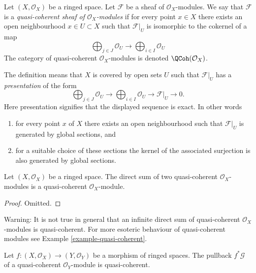 \begin{definition}
\label{definition-quasi-coherent}
Let $(X, \mathcal{O}_X)$ be a ringed space.
Let $\mathcal{F}$ be a sheaf of $\mathcal{O}_X$-modules.
We say that $\mathcal{F}$ is a {\it quasi-coherent
sheaf of $\mathcal{O}_X$-modules} if for every
point $x \in X$ there exists an open neighbourhood
$x\in U \subset X$ such that $\mathcal{F}|_U$
is isomorphic to the cokernel of a map
$$
\bigoplus\nolimits_{j \in J}
\mathcal{O}_U
\longrightarrow
\bigoplus\nolimits_{i \in I}
\mathcal{O}_U
$$
The category of quasi-coherent $\mathcal{O}_X$-modules
is denoted $\QCoh(\mathcal{O}_X)$.
\end{definition}

\noindent
The definition means that $X$ is covered by open sets $U$
such that $\mathcal{F}|_U$ has a {\it presentation}
of the form
$$
\bigoplus\nolimits_{j \in J}
\mathcal{O}_U
\longrightarrow
\bigoplus\nolimits_{i \in I}
\mathcal{O}_U
\longrightarrow
\mathcal{F}|_U
\longrightarrow
0.
$$
Here presentation signifies that the displayed
sequence is exact. In other words
\begin{enumerate}
\item for every point $x$ of $X$ there exists
an open neighbourhood such that $\mathcal{F}|_U$
is generated by global sections, and
\item for a suitable choice of these sections
the kernel of the associated surjection is also
generated by global sections.
\end{enumerate}

\begin{lemma}
\label{lemma-direct-sum-quasi-coherent}
Let $(X, \mathcal{O}_X)$ be a ringed space.
The direct sum of two quasi-coherent $\mathcal{O}_X$-modules is
a quasi-coherent $\mathcal{O}_X$-module.
\end{lemma}

\begin{proof}
Omitted.
\end{proof}

\begin{remark}
\label{remark-infinite-direct-sum-quasi-coherent-not}
Warning: It is not true in general that an infinite
direct sum of quasi-coherent $\mathcal{O}_X$-modules
is quasi-coherent. For more esoteric behaviour of quasi-coherent
modules see Example \ref{example-quasi-coherent}.
\end{remark}

\begin{lemma}
\label{lemma-pullback-quasi-coherent}
Let $f : (X, \mathcal{O}_X) \to (Y, \mathcal{O}_Y)$
be a morphism of ringed spaces.
The pullback $f^*\mathcal{G}$ of a quasi-coherent
$\mathcal{O}_Y$-module is quasi-coherent.
\end{lemma}

